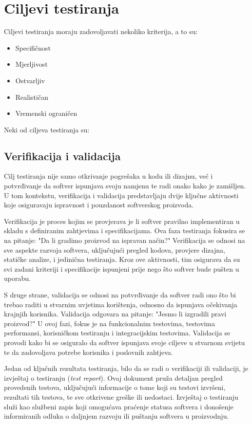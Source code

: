 \section{Ciljevi testiranja}
Ciljevi testiranja moraju zadovoljavati nekoliko kriterija, a to su:
\begin{itemize}
\item Specifičnost
\item Mjerljivost
\item Ostvarljiv
\item Realističan
\item Vremenski ograničen
\end{itemize}

Neki od ciljeva testiranja su:
\subsection*{Verifikacija i validacija}
Cilj testiranja nije samo otkrivanje pogrešaka u kodu ili dizajnu, već i potvrđivanje da softver ispunjava svoju namjenu te radi onako kako je zamišljen.
U tom kontekstu, verifikacija i validacija predstavljaju dvije ključne aktivnosti koje osiguravaju ispravnost i pouzdanost softverskog proizvoda.

Verifikacija je proces kojim se provjerava je li softver pravilno implementiran u skladu s definiranim zahtjevima i specifikacijama.
Ova faza testiranja fokusira se na pitanje: "Da li gradimo proizvod na ispravan način?" Verifikacija se odnosi na sve aspekte razvoja softvera, uključujući pregled kodova, provjere dizajna, statičke analize, i jedinična testiranja.
Kroz ove aktivnosti, tim osigurava da su svi zadani kriteriji i specifikacije ispunjeni prije nego što softver bude pušten u uporabu.

S druge strane, validacija se odnosi na potvrđivanje da softver radi ono što bi trebao raditi u stvarnim uvjetima korištenja, odnosno da ispunjava očekivanja krajnjih korisnika.
Validacija odgovara na pitanje: "Jesmo li izgradili pravi proizvod?" U ovoj fazi, fokus je na funkcionalnim testovima, testovima performansi, korisničkom testiranju i integracijskim testovima.
Validacija se provodi kako bi se osiguralo da softver ispunjava svoje ciljeve u stvarnom svijetu te da zadovoljava potrebe korisnika i poslovnih zahtjeva.

Jedan od ključnih rezultata testiranja, bilo da se radi o verifikaciji ili validaciji, je izvještaj o testiranju (\textit{test report}).
Ovaj dokument pruža detaljan pregled provedenih testova, uključujući informacije o tome koji su testovi izvršeni, rezultati tih testova, te sve otkrivene greške ili nedostaci.
Izvještaj o testiranju služi kao službeni zapis koji omogućava praćenje statusa softvera i donošenje informiranih odluka o daljnjem razvoju ili puštanju softvera u proizvodnju.

